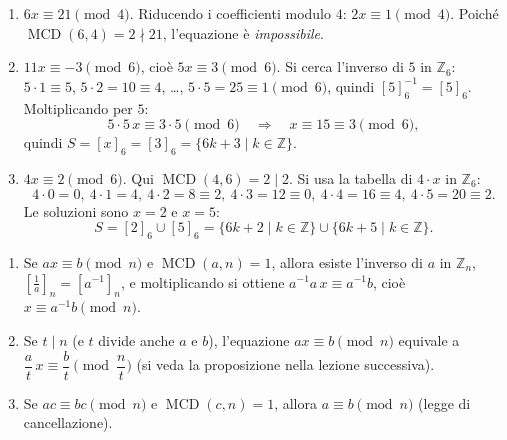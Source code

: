 \documentclass[11pt,a4paper]{article}
\begin{document}
\begin{esempio}
\begin{enumerate}
  \item $6x \equiv 21 \pmod 4$. Riducendo i coefficienti modulo $4$: $2x \equiv 1 \pmod 4$. Poiché $\operatorname{MCD}(6, 4) = 2 \nmid 21$, l'equazione è \emph{impossibile}.
  \item $11x \equiv -3 \pmod 6$, cioè $5x \equiv 3 \pmod 6$. Si cerca l'inverso di $5$ in $\mathbb{Z}_6$: $5\cdot 1 \equiv 5$, $5\cdot 2 = 10 \equiv 4$, \dots, $5\cdot 5 = 25 \equiv 1 \pmod 6$, quindi $[5]_6^{-1} = [5]_6$. Moltiplicando per $5$:
  \[
    5\cdot 5\,x \equiv 3\cdot 5 \pmod 6 \quad\Rightarrow\quad x \equiv 15 \equiv 3 \pmod 6,
  \]
  quindi $S = [x]_6 = [3]_6 = \{6k + 3 \mid k \in \mathbb{Z}\}$.
  \item $4x \equiv 2 \pmod 6$. Qui $\operatorname{MCD}(4, 6) = 2 \mid 2$. Si usa la tabella di $4\cdot x$ in $\mathbb{Z}_6$:
  \[
    4\cdot 0 = 0,\ 4\cdot 1 = 4,\ 4\cdot 2 = 8 \equiv 2,\ 4\cdot 3 = 12 \equiv 0,\ 4\cdot 4 = 16 \equiv 4,\ 4\cdot 5 = 20 \equiv 2.
  \]
  Le soluzioni sono $x = 2$ e $x = 5$:
  \[
    S = [2]_6 \cup [5]_6 = \{6k + 2 \mid k \in \mathbb{Z}\} \cup \{6k + 5 \mid k \in \mathbb{Z}\}.
  \]
\end{enumerate}
\end{esempio}

\begin{osservazione}
\begin{enumerate}
  \item Se $ax \equiv b \pmod n$ e $\operatorname{MCD}(a, n) = 1$, allora esiste l'inverso di $a$ in $\mathbb{Z}_n$, $\left[\tfrac{1}{a}\right]_n = [a^{-1}]_n$, e moltiplicando si ottiene $a^{-1}a\,x \equiv a^{-1}b$, cioè $x \equiv a^{-1}b \pmod n$.
  \item Se $t \mid n$ (e $t$ divide anche $a$ e $b$), l'equazione $ax \equiv b \pmod n$ equivale a $\dfrac{a}{t}\,x \equiv \dfrac{b}{t} \pmod{\dfrac{n}{t}}$ (si veda la proposizione nella lezione successiva).
  \item Se $ac \equiv bc \pmod n$ e $\operatorname{MCD}(c, n) = 1$, allora $a \equiv b \pmod n$ (legge di cancellazione).
\end{enumerate}
\end{osservazione}
\end{document}
